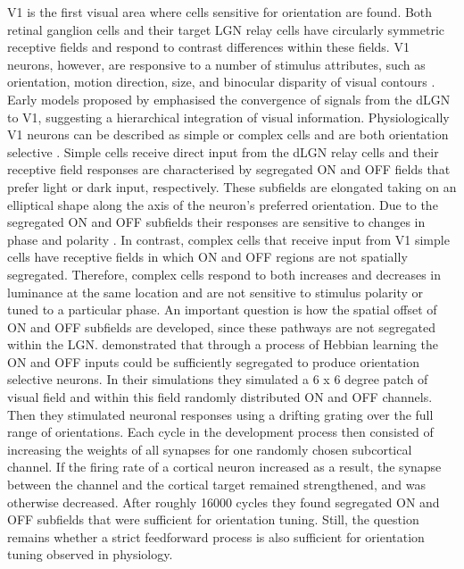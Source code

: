 \documentclass[12pt]{article}
\begin{document}
V1 is the first visual area where cells sensitive for orientation are found. Both retinal ganglion cells and their target LGN relay cells have circularly symmetric receptive fields and respond to contrast differences within these fields. V1 neurons, however, are responsive to a number of stimulus attributes, such as orientation, motion direction, size, and binocular disparity of visual contours \autocite{hubelReceptiveFieldsBinocular1962}. Early models proposed by \textcite{hubelReceptiveFieldsBinocular1962} emphasised the convergence of signals from the dLGN to V1, suggesting a hierarchical integration of visual information. Physiologically V1 neurons can be described as simple or complex cells and are both orientation selective \autocite{skottunClassifyingSimpleComplex1991}. Simple cells receive direct input from the dLGN relay cells and their receptive field responses are characterised by segregated ON and OFF fields that prefer light or dark input, respectively. These subfields are elongated taking on an elliptical shape along the axis of the neuron's preferred orientation. Due to the segregated ON and OFF subfields their responses are sensitive to changes in phase and polarity \autocite{mechlerClassificationSimpleComplex2002}. In contrast, complex cells that receive input from V1 simple cells have receptive fields in which ON and OFF regions are not spatially segregated. Therefore, complex cells respond to both increases and decreases in luminance at the same location and are not sensitive to stimulus polarity or tuned to a particular phase. An important question is how the spatial offset of ON and OFF subfields are developed, since these pathways are not segregated within the LGN. \textcite{nguyenModelOriginDevelopment2019} demonstrated that through a process of Hebbian learning the ON and OFF inputs could be sufficiently segregated to produce orientation selective neurons. In their simulations they simulated a 6 x 6 degree patch of visual field and within this field randomly distributed ON and OFF channels. Then they stimulated neuronal responses using a drifting grating over the full range of orientations. Each cycle in the development process then consisted of increasing the weights of all synapses for one randomly chosen subcortical channel. If the firing rate of a cortical neuron increased as a result, the synapse between the channel and the cortical target remained strengthened, and was otherwise decreased. After roughly 16000 cycles they found segregated ON and OFF subfields that were sufficient for orientation tuning. Still, the question remains whether a strict feedforward process is also sufficient for orientation tuning observed in physiology.
\end{document}
